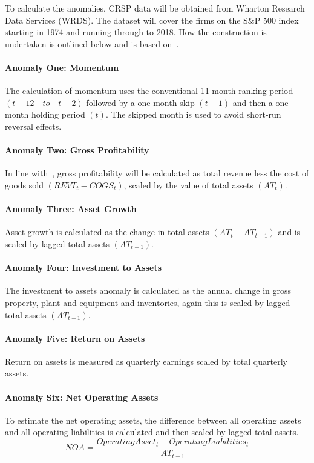 \documentclass[a4paper,12pt]{article}                 %
\begin{document}
To calculate the anomalies, CRSP data will be obtained from Wharton Research Data Services (WRDS). The dataset will cover the firms on the S\&P 500 index starting in 1974 and running through to 2018. How the construction is undertaken is outlined below and is based on~\cite{chu2017causal}.

\paragraph*{Anomaly One: Momentum}
The calculation of momentum uses the conventional 11 month ranking period \((t-12 \quad to \quad t-2)\) followed by a one month skip $(t-1)$ and then a one month holding period $(t)$. The skipped month is used to avoid short-run reversal effects.

\paragraph*{Anomaly Two: Gross Profitability}
In line with~\cite{novy2013other}, gross profitability will be calculated as total revenue less the cost of goods sold \((REVT_t-COGS_t)\), scaled by the value of total assets $(AT_t)$. 

\paragraph*{Anomaly Three: Asset Growth}
Asset growth is calculated as the change in total assets \((AT_t  - AT_{t-1})\) and is scaled by lagged total assets \((AT_{t-1})\).

\paragraph*{Anomaly Four: Investment to Assets}
The investment to assets anomaly is calculated as the annual change in gross property, plant and equipment and inventories, again this is scaled by lagged total assets \((AT_{t-1})\). 

\paragraph*{Anomaly Five: Return on Assets}
Return on assets is measured as quarterly earnings scaled by total quarterly assets. 

\paragraph*{Anomaly Six: Net Operating Assets}
To estimate the net operating assets, the difference between all operating assets and all operating liabilities is calculated and then scaled by lagged total assets.
\[
NOA= \frac{Operating Asset_t-Operating Liabilities_t}{AT_{t-1}}\]
\end{document}
